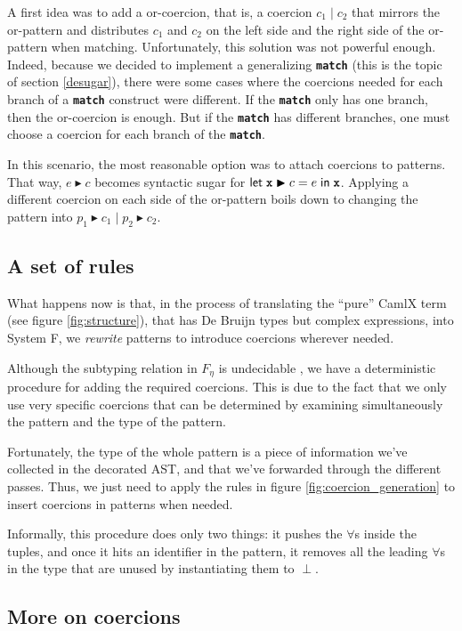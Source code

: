 \documentclass[10pt,a4paper,twoside,titlepage,twocolumn]{article}
\newcommand{\code}[1]{\textbf{\texttt{#1}}}
\begin{document}
A first idea was to add a or-coercion, that is, a coercion $c_1\;|\;c_2$ that
mirrors the or-pattern and distributes $c_1$ and $c_2$ on the left side and the
right side of the or-pattern when matching. Unfortunately, this solution was not
powerful enough. Indeed, because we decided to implement a generalizing
\code{match} (this is the topic of section \vref{desugar}), there were some
cases where the coercions needed for each branch of a \code{match} construct
were different. If the \code{match} only has one branch, then the or-coercion is
enough. But if the \code{match} has different branches, one must choose a
coercion for each branch of the \code{match}.

In this scenario, the most reasonable option was to attach coercions to
patterns. That way, $e \blacktriangleright c$ becomes syntactic sugar for
$\kwd{let}\; \evid \blacktriangleright c = e\;\kwd{in}\; \evid$. Applying a
different coercion on each side of the or-pattern boils down to changing the
pattern into $p_1 \blacktriangleright c_1\;|\; p_2 \blacktriangleright c_2$.

\subsection{A set of rules}

What happens now is that, in the process of translating the ``pure'' CamlX term
(see figure \vref{fig:structure}), that has De Bruijn types but complex
expressions, into System F, we \emph{rewrite} patterns to introduce coercions
wherever needed.

Although the subtyping relation in $F_\eta$ is undecidable \cite{mitchell-88},
we have a deterministic procedure for adding the required coercions. This is due
to the fact that we only use very specific coercions that can be determined by
examining simultaneously the pattern and the type of the pattern.

Fortunately, the type of the whole pattern is a piece of information we've
collected in the decorated AST, and that we've forwarded through the different
passes. Thus, we just need to apply the rules in figure
\vref{fig:coercion_generation} to insert coercions in patterns when needed.

Informally, this procedure does only two things: it pushes the $\forall$s inside
the tuples, and once it hits an identifier in the pattern, it removes all the
leading $\forall$s in the type that are unused by instantiating them to $\perp$.

\subsection{More on coercions}
\end{document}
